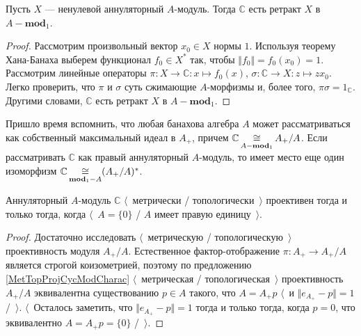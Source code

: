 \begin{proposition}\label{AnnihCModIsRetAnnihMod} Пусть $X$ --- ненулевой аннуляторный $A$-модуль. Тогда $\mathbb{C}$ есть ретракт $X$ в $A-\mathbf{mod}_1$.
\end{proposition}
\begin{proof} Рассмотрим произвольный вектор $x_0\in X$ нормы $1$. Используя теорему Хана-Банаха выберем функционал $f_0\in X^*$ так, чтобы $\Vert f_0\Vert=f_0(x_0)=1$. Рассмотрим линейные операторы $\pi:X\to \mathbb{C}:x\mapsto f_0(x)$, $\sigma:\mathbb{C}\to X:z\mapsto zx_0$. Легко проверить, что $\pi$ и $\sigma$ суть сжимающие $A$-морфизмы и, более того, $\pi\sigma=1_\mathbb{C}$. Другими словами, $\mathbb{C}$ есть ретракт $X$ в $A-\mathbf{mod}_1$.
\end{proof}

Пришло время вспомнить, что любая банахова алгебра $A$ может рассматриваться как собственный максимальный идеал в $A_+$, причем $\mathbb{C}\mathop{\mathbin{\cong}}\limits_{A-\mathbf{mod}_1} A_+/A$. Если рассматривать $\mathbb{C}$ как правый аннуляторный $A$-модуль, то имеет место еще один изоморфизм  $\mathbb{C}\mathop{\mathbin{\cong}}\limits_{\mathbf{mod}_1-A}(A_+/A)^*$. 

\begin{proposition}\label{MetTopProjModCCharac} Аннуляторный $A$-модуль $\mathbb{C}$ $\langle$~метрически / топологически~$\rangle$ проективен тогда и только тогда, когда $\langle$~$A=\{0\}$ / $A$ имеет правую единицу~$\rangle$.
\end{proposition}
\begin{proof} 
Достаточно исследовать $\langle$~метрическую / топологическую~$\rangle$ проективность модуля $A_+/A$. Естественное фактор-отображение $\pi:A_+\to A_+/A$ является строгой коизометрией, поэтому по предложению \ref{MetTopProjCycModCharac} $\langle$~метрическая / топологическая~$\rangle$ проективность $A_+/A$ эквивалентна существованию $p\in A$ такого, что $A=A_+p$ $\langle$~и $\Vert e_{A_+}-p\Vert=1$ /~$\rangle$. $\langle$~Осталось заметить, что $\Vert e_{A_+}-p\Vert=1$ тогда и только тогда, когда $p=0$, что эквивалентно $A=A_+p=\{0\}$ /~$\rangle$.
\end{proof}

